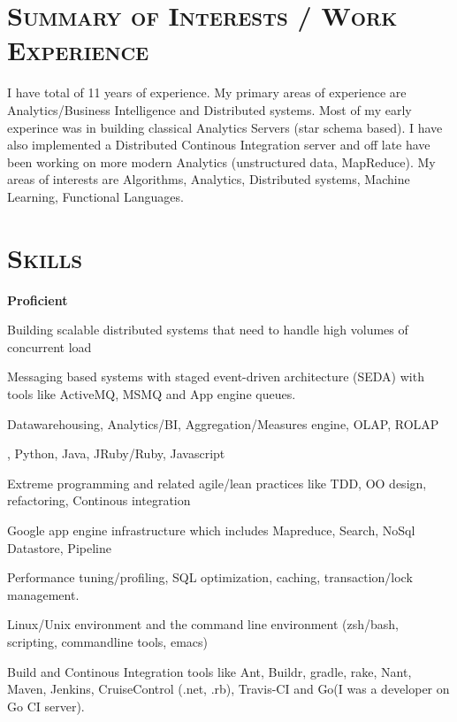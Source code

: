 \begin{resume}




\section{\textsc{Summary of Interests / Work Experience}}
I have total of 11 years of experience. My primary areas of experience are Analytics/Business Intelligence and Distributed systems. Most of my early experince was in building classical Analytics Servers (star schema based). I have also implemented a Distributed Continous Integration server and off late have been working on more modern Analytics (unstructured data, MapReduce). My areas of interests are Algorithms, Analytics, Distributed systems, Machine Learning, Functional Languages.

\section{\textsc{Skills}} 
{\textbf{Proficient}}
\begin{mylist}
  \item Building scalable distributed systems that need to handle high volumes of concurrent load
  \item Messaging based systems with staged event-driven architecture (SEDA) with tools like ActiveMQ, MSMQ and App engine queues.
  \item Datawarehousing, Analytics/BI, Aggregation/Measures engine, OLAP, ROLAP
  \item \CSharp, Python, Java, JRuby/Ruby, Javascript
  \item Extreme programming and related agile/lean practices like TDD, OO design, refactoring, Continous integration
  \item Google app engine infrastructure which includes Mapreduce, Search, NoSql Datastore, Pipeline
  \item Performance tuning/profiling, SQL optimization, caching, transaction/lock management.
  \item Linux/Unix environment and the command line environment (zsh/bash, scripting, commandline tools, emacs)

  \item Build and Continous Integration tools like Ant, Buildr, gradle, rake, Nant, Maven,  Jenkins, CruiseControl (.net, .rb), Travis-CI and Go(I was a developer on Go CI server).
\end{mylist}


\end{resume}
